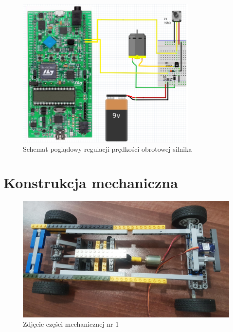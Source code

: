 \documentclass[10pt, a4paper]{article}
\begin{document}
\begin{figure}[H]
	\centering
	\includegraphics[width=0.8\textwidth]{figures/pwm.png}
	\caption{Schemat poglądowy regulacji prędkości obrotowej silnika}
	\label{fig:KonfiguracjaPWM}
\end{figure}

\section{Konstrukcja mechaniczna}

	\begin{figure}[H]
		\centering
		\includegraphics[width=1\textwidth]{figures/20190410_135905.jpg}
		\caption{Zdjęcie części mechanicznej nr 1}
		\label{fig:Zdjęcie części mechanicznej nr 1}
	\end{figure}
	
\end{document}
